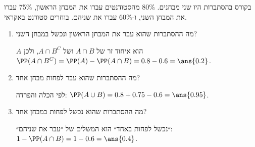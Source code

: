 בקורס בהסתברות היו שני מבחנים. 80\% מהסטודנטים עברו את המבחן הראשון, 75\% עברו את המבחן השני, ו-60\% עברו את שניהם. בוחרים סטודנט באקראי.
\begin{enumerate}
\item מה ההסתברות שהוא עבר את המבחן הראשון ונכשל במבחן השני?
\begin{solbox}
$A$ הוא איחוד זר של $A\cap B$ ושל $A\cap B^C$, ולכן $\PP(A\cap B^C)=\PP(A)-\PP(A\cap B)=0.8-0.6=\ans{0.2}$.
\end{solbox}
\item מה ההסתברות שהוא עבר לפחות מבחן אחד?
\begin{solbox}
לפי הכלה והפרדה: $\PP(A\cup B)=0.8+0.75-0.6=\ans{0.95}$.
\end{solbox}
\item מה ההסתברות שהוא נכשל לפחות במבחן אחד?
\begin{solbox}
״נכשל לפחות באחד״ הוא המשלים של ״עבר את שניהם״: $1-\PP(A\cap B)=1-0.6=\ans{0.4}$.
\end{solbox}
\end{enumerate}
